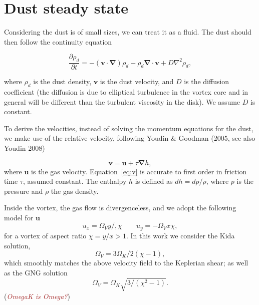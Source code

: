 \documentclass[apj]{emulateapj}
\newcommand{\pderiv}[2]{\frac{\partial #1}{\partial #2}}
\renewcommand{\v}[1]{{\boldsymbol{#1}}} %
\def\brown#1{\textcolor{brown}{#1}}
\newcommand{\comm}[1]{({\it \brown{#1}})}
\newcommand{\del}{\v{\nabla}}
\newcommand{\grad}{\del}
\newcommand{\Div}{\del\cdot}
\newcommand{\Laplace}{\nabla^2}
\newcommand{\beq}{\begin{equation}}
\newcommand{\eeq}{\end{equation}}
\begin{document}




\section{Dust steady state} 
\label{sect:model-equations}

Considering the dust is of small sizes, we can treat it as a
fluid. The dust should then follow the continuity equation 

\beq
  \pderiv{\rho_d}{t} = -(\v{v}\cdot\del)\rho_d - \rho_d \Div{\v{v}} + D\Laplace{\rho_d},
  \label{eq:continuity}
\eeq

\noindent where $\rho_d$ is the dust density, $\v{v}$ is the dust
velocity, and $D$ is the diffusion coefficient (the diffusion is due
to elliptical turbulence in the vortex core and in general will be
different than the turbulent viscosity in the disk). We assume $D$ is
constant. 

To derive the velocities, instead of solving the momentum equations
for the dust, we make use of the relative velocity, following Youdin \& Goodman (2005,
see also Youdin 2008)  

\beq
\v{v} = \v{u} + \tau  \grad{h}, 
\label{eq:v}
\eeq
\noindent where $\v{u}$ is the gas velocity. Equation~\ref{eq:v} is 
accurate to first order in friction time $\tau$, assumed 
constant. The enthalpy $h$ is defined as $dh = dp /\rho$, where $p$ 
is the pressure and $\rho$ the gas density. 

Inside the vortex, the gas flow is divergenceless, and 
we adopt the following model for $\v{u}$
\beq
  u_x = \varOmega_V y /, \chi \qquad  u_y= -\varOmega_V x \chi,
  \label{eq:vortex}
\eeq
\noindent for a vortex of aspect ratio $\chi= y/x > 1$. In this work
we consider the Kida solution,
\beq
\varOmega_V = 3\Omega_K/2(\chi-1),  
\eeq
which smoothly matches the above velocity field to the Keplerian
shear; as well as the GNG solution
\beq
\varOmega_V=\varOmega_K\sqrt{3/(\chi^2-1)}.
\eeq
\comm{OmegaK is Omega?}
\end{document}

